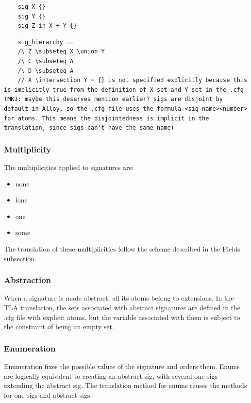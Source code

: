 \begin{verbatim}
	sig X {}
	sig Y {}
	sig Z in X + Y {}
\end{verbatim}

\begin{verbatim}
	sig_hierarchy ==
	/\ Z \subseteq X \union Y
	/\ C \subseteq A
	/\ D \subseteq A
	// X \intersection Y = {} is not specified explicitly because this is implicitly true from the definition of X_set and Y_set in the .cfg (MKJ: maybe this deserves mention earlier? sigs are disjoint by default in Alloy, so the .cfg file uses the formula <sig-name><number> for atoms. This means the disjointedness is implicit in the translation, since sigs can't have the same name)
\end{verbatim}



\subsubsection{Multiplicity}

The multiplicities applied to signatures are:

\begin{itemize}
	\item none
	\item lone
	\item one
	\item some
\end{itemize}

The translation of these multiplicities follow the scheme described in the Fields subsection.

\subsubsection{Abstraction}

When a signature is made abstract, all its atoms belong to extensions. In the TLA translation, the sets associated with abstract signatures are defined in the .cfg file with explicit atoms, but the variable associated with them is subject to the constraint of being an empty set.

\subsubsection{Enumeration}

Enumeration fixes the possible values of the signature and orders them. Enums are logically equivalent to creating an abstract sig, with several one-sigs extending the abstract sig. The translation method for enums reuses the methods for one-sigs and abstract sigs.


